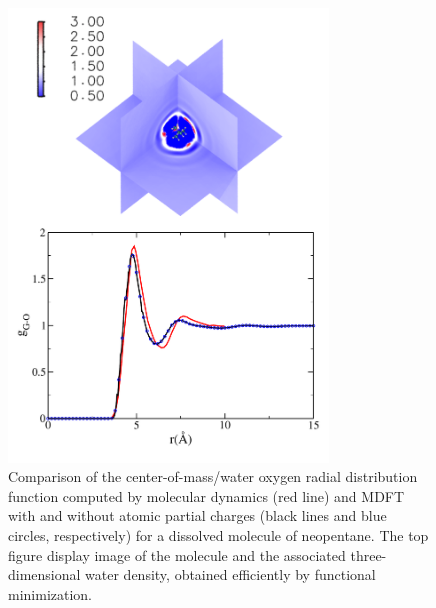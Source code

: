 \documentclass[aip,jcp,preprint]{revtex4-1}
\begin{document}
\begin{figure}
    \includegraphics[width=8.5cm]{neopentane_g_and_dens.pdf}
    \caption{
        \label{fig:gr_neopentane}
        Comparison of the center-of-mass/water oxygen radial distribution function computed by molecular dynamics (red line) and MDFT
        with and without atomic partial charges (black lines and blue circles, respectively) for a dissolved molecule of neopentane. The top figure display image of the molecule and the associated three-dimensional water density, obtained efficiently by functional minimization.
        }
\end{figure}
\end{document}
